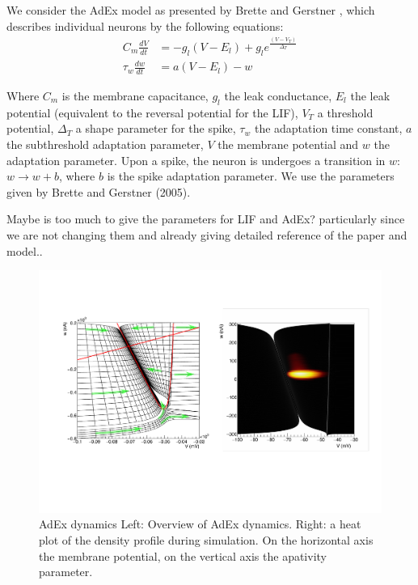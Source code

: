 \documentclass[10pt]{article}
\newcommand{\noteMdK}[2]{}
\newcommand{\noteMP}[3]{(}
\begin{document}
We consider the AdEx model as presented by Brette and Gerstner \cite{brette2005adaptive}, which describes individual neurons by the following equations:
\begin{align}
  C_m \frac{dV}{dt}    & =  -g_l(V - E_l)  + g_l e^{ \frac{(V - V_T)}{\Delta_{T}}} \\
  \tau_w \frac{dw}{dt} & =  a(V-E_l) -w \nonumber
\end{align}

Where $C_m$ is the membrane capacitance, $g_l$ the leak conductance, $E_l$ the leak potential (equivalent to the reversal potential for the LIF), $V_T$ a threshold potential, $\Delta_T$ a shape parameter for the spike, $\tau_w$ the adaptation time constant, $a$ the subthreshold adaptation parameter,  $V$ the membrane potential and $w$ the adaptation parameter. Upon a spike, the neuron is undergoes a transition in $w$: $w \rightarrow w +b$, where $b$ is the spike adaptation parameter.
We use the parameters given by Brette and Gerstner (2005).

\noteMdK{I need to look them up and edit them in.} \noteMP{Maybe is too much to give the parameters for LIF and AdEx? particularly since we are not changing them and already giving detailed reference of the paper and model.}.

\begin{figure}[h!]
  \begin{center}
    \includegraphics[width=1.0\columnwidth]{figures/aexp_overview.pdf}
    \caption{{AdEx dynamics {\label{fig-adex}} Left: Overview of AdEx dynamics.
        Right: a heat plot of the density profile during simulation. On the horizontal axis the membrane potential, on the vertical axis the apativity parameter.
      }}
  \end{center}
\end{figure}
\end{document}
